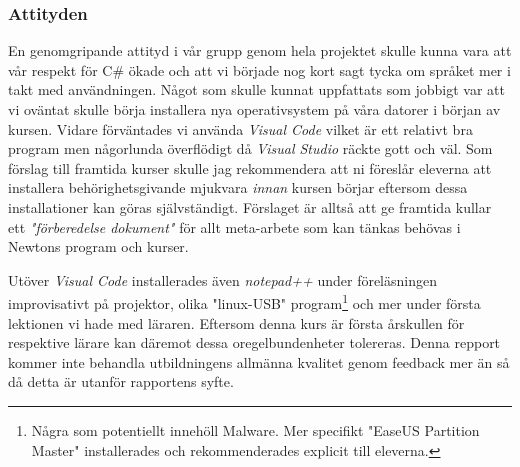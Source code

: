 \documentclass{article}
\theoremstyle{remark}                                         %
\begin{document}
\subsubsection{Attityden}
En genomgripande attityd i vår grupp genom hela projektet skulle kunna vara att vår respekt för C\# ökade och att vi började nog kort sagt tycka om språket mer i takt med användningen. Något som skulle kunnat uppfattats som jobbigt var att vi oväntat skulle börja installera nya operativsystem på våra datorer i början av kursen. Vidare förväntades vi använda  \emph{Visual Code} vilket är ett relativt bra program men någorlunda överflödigt då \emph{Visual Studio} räckte gott och väl. Som förslag till framtida kurser skulle jag rekommendera att ni föreslår eleverna att installera behörighetsgivande mjukvara \emph{innan} kursen börjar eftersom dessa installationer kan göras självständigt. Förslaget är alltså att ge framtida kullar ett \emph{"förberedelse dokument"} för allt meta-arbete som kan tänkas behövas i Newtons program och kurser.

Utöver \emph{Visual Code} installerades även  \emph{notepad++} under föreläsningen improvisativt på projektor, olika  "linux-USB" program\footnote{Några som potentiellt innehöll  Malware. Mer specifikt "EaseUS Partition Master" installerades och rekommenderades explicit till eleverna.} och mer under första lektionen vi hade med läraren.
Eftersom denna kurs är första årskullen för respektive lärare kan däremot dessa oregelbundenheter tolereras. Denna repport kommer inte behandla utbildningens allmänna kvalitet genom feedback mer än så då detta är utanför rapportens syfte.
\end{document}
